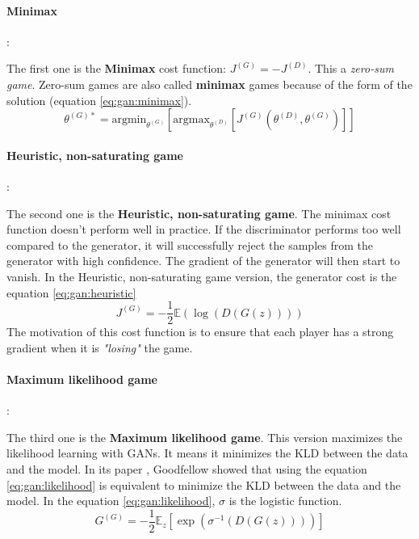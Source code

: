 \documentclass[12pt]{report}
\begin{document}
\paragraph{Minimax}:

The first one is the \textbf{Minimax} cost function: $J^{(G)} = - J^{(D)}$.
This a \textit{zero-sum game}.
Zero-sum games are also called \textbf{minimax} games because of the form of the solution (equation \ref{eq:gan:minimax}).
\begin{equation}
    \theta^{(G)*} = \text{argmin}_{\theta^{(G)}} \left[ \text{argmax}_{\theta^{(D)}} \left[ J^{(G)} \left( \theta^{(D)}, \theta^{(G)} \right) \right] \right]
    \label{eq:gan:minimax}
\end{equation}

\paragraph{Heuristic, non-saturating game}:

The second one is the \textbf{Heuristic, non-saturating game}.
The minimax cost function doesn't perform well in practice.
If the discriminator performs too well compared to the generator, it will successfully reject the samples from the generator with high confidence.
The gradient of the generator will then start to vanish.
In the Heuristic, non-saturating game version, the generator cost is the equation \ref{eq:gan:heuristic}
\begin{equation}
    J^{(G)} = - \frac{1}{2} \mathbb{E} (\log(D(G(z))))
    \label{eq:gan:heuristic}
\end{equation}
The motivation of this cost function is to ensure that each player has a strong gradient when it is \textit{"losing"} the game.

\paragraph{Maximum likelihood game}:

The third one is the \textbf{Maximum likelihood game}.
This version maximizes the likelihood learning with GANs.
It means it minimizes the KLD between the data and the model.
In its paper \cite{goodfellow_generative_2014}, Goodfellow showed that using the equation \ref{eq:gan:likelihood} is equivalent to minimize the KLD between the data and the model.
In the equation \ref{eq:gan:likelihood}, $\sigma$ is the logistic function.
\begin{equation}
    G^{(G)} = - \frac{1}{2} \mathbb{E}_{z} \left[ \exp \left( \sigma^{-1} (D(G(z))) \right) \right]
    \label{eq:gan:likelihood}
\end{equation}
\end{document}
